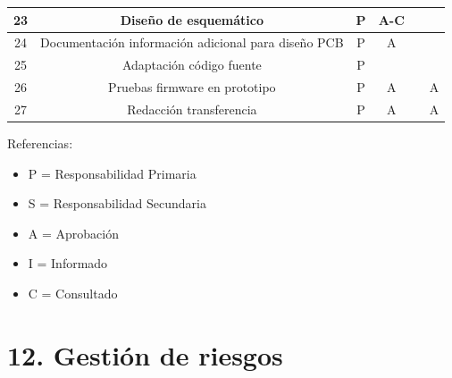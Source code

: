 \documentclass[11pt]{charter}
\begin{document}
\begin{table}[htpb]
{\begin{tabular}{|c|c|c|c|c|c|}
23 & Diseño de esquemático                                          & P & A-C &  &  \\ \hline
24 & Documentación información adicional para diseño PCB            & P & A &  &  \\ \hline 
25 & Adaptación código fuente                                       & P &  &  &  \\ \hline
26 & Pruebas firmware en prototipo                                  & P & A &  & A \\ \hline
27 & Redacción transferencia                                        & P & A &  & A \\ \hline 

\end{tabular}%
}
\end{table}

{\footnotesize
Referencias:
\begin{itemize}
	\item P = Responsabilidad Primaria
	\item S = Responsabilidad Secundaria
	\item A = Aprobación
	\item I = Informado
	\item C = Consultado
\end{itemize}
} %

%
%

\section{12. Gestión de riesgos}
\label{sec:riesgos}
\end{document}
